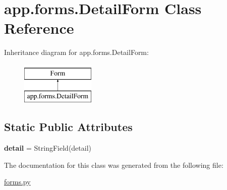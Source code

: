 \hypertarget{classapp_1_1forms_1_1DetailForm}{}\section{app.\+forms.\+Detail\+Form Class Reference}
\label{classapp_1_1forms_1_1DetailForm}
Inheritance diagram for app.\+forms.\+Detail\+Form\+:\begin{figure}[H]
\begin{center}
\leavevmode
\includegraphics[height=2.000000cm]{classapp_1_1forms_1_1DetailForm}
\end{center}
\end{figure}
\subsection*{Static Public Attributes}
\begin{DoxyCompactItemize}
\item 
{\bfseries detail} = String\+Field(\textquotesingle{}detail\textquotesingle{})\hypertarget{classapp_1_1forms_1_1DetailForm_a2cc0fb4bf2fe0aae12f17757db3a5748}{}\label{classapp_1_1forms_1_1DetailForm_a2cc0fb4bf2fe0aae12f17757db3a5748}

\end{DoxyCompactItemize}


The documentation for this class was generated from the following file\+:\begin{DoxyCompactItemize}
\item 
\hyperlink{forms_8py}{forms.\+py}\end{DoxyCompactItemize}
